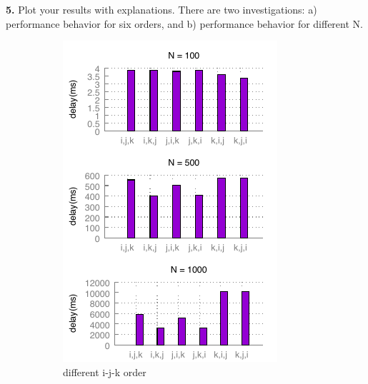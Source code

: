 \documentclass{article}
\begin{document}
\textbf{5.} Plot your results with explanations. There are two investigations: a) performance behavior for six orders, and b) performance behavior for different N.\\
    \begin{figure}[h!]
        \centering
        \begin{subfigure}[b]{0.4\linewidth}
          \includegraphics[width=\linewidth]{matrix_ijk.pdf}
          \caption{different i-j-k order}
          \label{fig:ijk}
        \end{subfigure}
        \begin{subfigure}[b]{0.4\linewidth}

\end{subfigure}
\end{figure}
\end{document}
